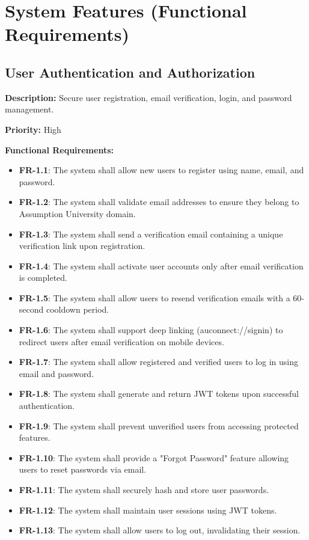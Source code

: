 \documentclass[12pt,a4paper]{article}
\begin{document}
\section{System Features (Functional Requirements)}

\subsection{User Authentication and Authorization}
\textbf{Description:} Secure user registration, email verification, login, and password management.

\textbf{Priority:} High

\textbf{Functional Requirements:}

\begin{itemize}
    \item \textbf{FR-1.1}: The system shall allow new users to register using name, email, and password.
    \item \textbf{FR-1.2}: The system shall validate email addresses to ensure they belong to Assumption University domain.
    \item \textbf{FR-1.3}: The system shall send a verification email containing a unique verification link upon registration.
    \item \textbf{FR-1.4}: The system shall activate user accounts only after email verification is completed.
    \item \textbf{FR-1.5}: The system shall allow users to resend verification emails with a 60-second cooldown period.
    \item \textbf{FR-1.6}: The system shall support deep linking (auconnect://signin) to redirect users after email verification on mobile devices.
    \item \textbf{FR-1.7}: The system shall allow registered and verified users to log in using email and password.
    \item \textbf{FR-1.8}: The system shall generate and return JWT tokens upon successful authentication.
    \item \textbf{FR-1.9}: The system shall prevent unverified users from accessing protected features.
    \item \textbf{FR-1.10}: The system shall provide a "Forgot Password" feature allowing users to reset passwords via email.
    \item \textbf{FR-1.11}: The system shall securely hash and store user passwords.
    \item \textbf{FR-1.12}: The system shall maintain user sessions using JWT tokens.
    \item \textbf{FR-1.13}: The system shall allow users to log out, invalidating their session.
\end{itemize}
\end{document}
